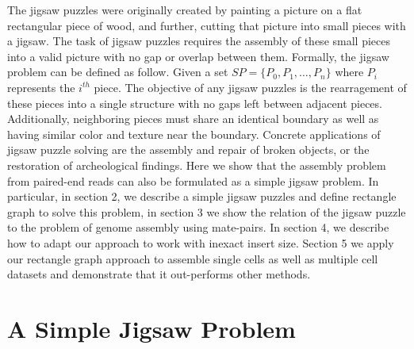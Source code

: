 \documentclass[a4paper]{article}
\begin{document}
The jigsaw puzzles were originally created by painting a picture on a flat rectangular piece of wood, 
and further, cutting that picture into
small pieces with a jigsaw. The task of jigsaw puzzles requires the assembly of these small pieces into a valid picture with no gap or overlap between
them. Formally, the jigsaw problem can be defined as follow. Given a set $SP = \{ P_0, P_1,\ldots, P_n\}$ where $P_i$ represents the $i^{th}$ piece.
The objective of any jigsaw puzzles is the rearragement of these pieces into a single structure with no gaps left between adjacent pieces. Additionally,
neighboring pieces must share an identical boundary as well as having similar color and 
texture near the boundary.
Concrete applications of jigsaw puzzle solving are the assembly and repair of broken objects, 
or the restoration of archeological findings. Here we show
that the assembly problem from paired-end reads can also be formulated as a simple jigsaw problem.
In particular, in section 2, we describe a simple jigsaw puzzles and define rectangle graph to solve this 
problem, in section 3 we show the relation of the jigsaw puzzle to the 
problem of genome assembly using mate-pairs. In section 4, we describe how to adapt our approach 
to work with inexact insert size. Section 5 we apply our rectangle graph approach to 
assemble single cells as well as multiple cell datasets and demonstrate that it out-performs
other methods.

\section{A Simple Jigsaw Problem}
\end{document}
